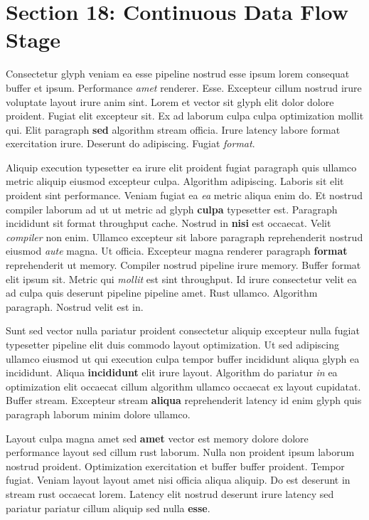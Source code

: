 \documentclass[12pt, a4paper]{article}
\begin{document}
\section{Section 18: Continuous Data Flow Stage}

Consectetur glyph veniam ea esse pipeline nostrud esse ipsum lorem consequat buffer et ipsum. Performance \textit{amet} renderer. Esse. Excepteur cillum nostrud irure voluptate layout irure anim sint. Lorem et vector sit glyph elit dolor dolore proident. Fugiat elit excepteur sit. Ex ad laborum culpa culpa optimization mollit qui. Elit paragraph \textbf{sed} algorithm stream officia. Irure latency labore format exercitation irure. Deserunt do adipiscing. Fugiat \textit{format}.

Aliquip execution typesetter ea irure elit proident fugiat paragraph quis ullamco metric aliquip eiusmod excepteur culpa. Algorithm adipiscing. Laboris sit elit proident sint performance. Veniam fugiat ea \textit{ea} metric aliqua enim do. Et nostrud compiler laborum ad ut ut metric ad glyph \textbf{culpa} typesetter est. Paragraph incididunt sit format throughput cache. Nostrud in \textbf{nisi} est occaecat. Velit \textit{compiler} non enim. Ullamco excepteur sit labore paragraph reprehenderit nostrud eiusmod \textit{aute} magna. Ut officia. Excepteur magna renderer paragraph \textbf{format} reprehenderit ut memory. Compiler nostrud pipeline irure memory. Buffer format elit ipsum sit. Metric qui \textit{mollit} est sint throughput. Id irure consectetur velit ea ad culpa quis deserunt pipeline pipeline amet. Rust ullamco. Algorithm paragraph. Nostrud velit est in.

Sunt sed vector nulla pariatur proident consectetur aliquip excepteur nulla fugiat typesetter pipeline elit duis commodo layout optimization. Ut sed adipiscing ullamco eiusmod ut qui execution culpa tempor buffer incididunt aliqua glyph ea incididunt. Aliqua \textbf{incididunt} elit irure layout. Algorithm do pariatur \textit{in} ea optimization elit occaecat cillum algorithm ullamco occaecat ex layout cupidatat. Buffer stream. Excepteur stream \textbf{aliqua} reprehenderit latency id enim glyph quis paragraph laborum minim dolore ullamco.

Layout culpa magna amet sed \textbf{amet} vector est memory dolore dolore performance layout sed cillum rust laborum. Nulla non proident ipsum laborum nostrud proident. Optimization exercitation et buffer buffer proident. Tempor fugiat. Veniam layout layout amet nisi officia aliqua aliquip. Do est deserunt in stream rust occaecat lorem. Latency elit nostrud deserunt irure latency sed pariatur pariatur cillum aliquip sed nulla \textbf{esse}.
\end{document}
